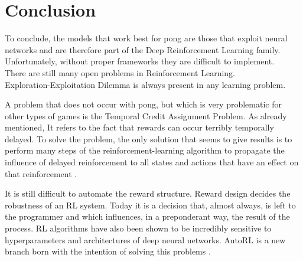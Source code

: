 \section{Conclusion}

To conclude, the models that work best for pong are those that exploit neural networks and are therefore part of the Deep Reinforcement Learning family.
Unfortunately, without proper frameworks they are difficult to implement. \\

There are still many open problems in Reinforcement Learning. \\

Exploration-Exploitation Dilemma is always present in any learning problem.

A problem that does not occur with pong, but which is very problematic for other types of games is the Temporal Credit Assignment Problem. As already mentioned, It refers to the fact that rewards can occur terribly temporally delayed. To solve the problem, the only solution that seems to give results is to perform many steps of the reinforcement-learning algorithm to propagate the influence of delayed reinforcement to all states and actions that have an effect on that reinforcement \cite{sutton1984temporal}. 

It is still difficult to automate the reward structure. Reward design decides the robustness of an RL system.
Today it is a decision that, almost always, is left to the programmer and which influences, 
in a preponderant way, the result of the process. 
RL algorithms have also been shown to be incredibly sensitive to hyperparameters and
architectures of deep neural networks. AutoRL is a new branch born with the intention of solving this problems \cite{parker2022automated}.
